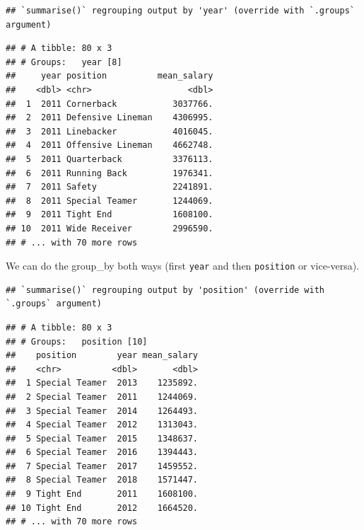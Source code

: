 \documentclass[
]{book}
\newenvironment{Shaded}{\begin{snugshade}}{\end{snugshade}}
\newcommand{\DataTypeTok}[1]{\textcolor[rgb]{0.13,0.29,0.53}{#1}}
\newcommand{\KeywordTok}[1]{\textcolor[rgb]{0.13,0.29,0.53}{\textbf{#1}}}
\newcommand{\NormalTok}[1]{#1}
\newcommand{\OperatorTok}[1]{\textcolor[rgb]{0.81,0.36,0.00}{\textbf{#1}}}
\newcommand{\StringTok}[1]{\textcolor[rgb]{0.31,0.60,0.02}{#1}}
\begin{document}
\begin{verbatim}
## `summarise()` regrouping output by 'year' (override with `.groups` argument)
\end{verbatim}

\begin{verbatim}
## # A tibble: 80 x 3
## # Groups:   year [8]
##     year position          mean_salary
##    <dbl> <chr>                   <dbl>
##  1  2011 Cornerback           3037766.
##  2  2011 Defensive Lineman    4306995.
##  3  2011 Linebacker           4016045.
##  4  2011 Offensive Lineman    4662748.
##  5  2011 Quarterback          3376113.
##  6  2011 Running Back         1976341.
##  7  2011 Safety               2241891.
##  8  2011 Special Teamer       1244069.
##  9  2011 Tight End            1608100.
## 10  2011 Wide Receiver        2996590.
## # ... with 70 more rows
\end{verbatim}

We can do the group\_by both ways (first \texttt{year} and then \texttt{position} or vice-versa).

\begin{Shaded}
\end{Shaded}

\begin{verbatim}
## `summarise()` regrouping output by 'position' (override with `.groups` argument)
\end{verbatim}

\begin{verbatim}
## # A tibble: 80 x 3
## # Groups:   position [10]
##    position        year mean_salary
##    <chr>          <dbl>       <dbl>
##  1 Special Teamer  2013    1235892.
##  2 Special Teamer  2011    1244069.
##  3 Special Teamer  2014    1264493.
##  4 Special Teamer  2012    1313043.
##  5 Special Teamer  2015    1348637.
##  6 Special Teamer  2016    1394443.
##  7 Special Teamer  2017    1459552.
##  8 Special Teamer  2018    1571447.
##  9 Tight End       2011    1608100.
## 10 Tight End       2012    1664520.
## # ... with 70 more rows
\end{verbatim}
\end{document}
